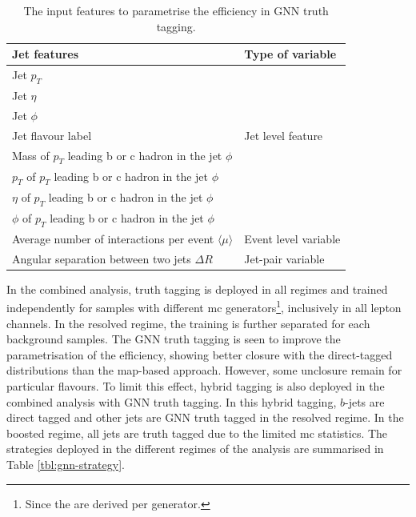 \begin{table}[tbp]
  \begin{center}
      \begin{tabular}{C{8cm}C{5cm}} \hline \hline
        Jet features & Type of variable \\ 
        \hline
        Jet $p_T$ & \\
        Jet $\eta$ & \\
        Jet $\phi$ & \\
        Jet flavour label & Jet level feature \\
        Mass of $p_T$ leading b or c hadron in the jet $\phi$ & \\
        $p_T$ of $p_T$ leading b or c hadron in the jet $\phi$ & \\
        $\eta$ of $p_T$ leading b or c hadron in the jet $\phi$ & \\
        $\phi$ of $p_T$ leading b or c hadron in the jet $\phi$ & \\
        \hline
        Average number of interactions per event $\langle \mu \rangle$ & Event level variable\\
        \hline
        Angular separation between two jets $\Delta R$ & Jet-pair variable\\
        \hline \hline
      \end{tabular}
    \caption{The input features to parametrise the efficiency in GNN truth tagging.}
    \label{tbl:gnn-features}
  \end{center}
\end{table}

In the combined analysis, truth tagging is deployed in all regimes and trained independently for samples with different \gls{mc} generators\footnote{Since the  are derived per generator.}, inclusively in all lepton channels. In the resolved regime, the training is further separated for each background samples. The GNN truth tagging is seen to improve the parametrisation of the efficiency, showing better closure with the direct-tagged distributions than the map-based approach. However, some unclosure remain for particular flavours. To limit this effect, hybrid tagging is also deployed in the combined analysis with GNN truth tagging. In this hybrid tagging, $b$-jets are direct tagged and other jets are GNN truth tagged in the resolved regime. In the boosted regime, all jets are truth tagged due to the limited \gls{mc} statistics. The strategies deployed in the different regimes of the analysis are summarised in Table \ref{tbl:gnn-strategy}.

